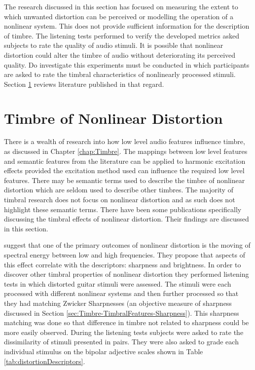 			The research discussed in this section has focused on measuring the extent to which unwanted
			distortion can be perceived or modelling the operation of a nonlinear system. This does not provide
			sufficient information for the description of timbre. The listening tests performed to verify the
			developed metrics asked subjects to rate the quality of audio stimuli. It is possible that nonlinear
			distortion could alter the timbre of audio without deteriorating its perceived quality. Do
			investigate this experiments must be conducted in which participants are asked to rate the timbral
			characteristics of nonlinearly processed stimuli. Section \ref{sec:Excitation-Timbre} reviews
			literature published in that regard.

\section{Timbre of Nonlinear Distortion}
\label{sec:Excitation-Timbre}
	There is a wealth of research into how low level audio features influence timbre, as discussed in Chapter
	\ref{chap:Timbre}. The mappings between low level features and semantic features from the literature can be applied
	to harmonic excitation effects provided the excitation method used can influence the required low level features.
	There may be semantic terms used to describe the timbre of nonlinear distortion which are seldom used to describe
	other timbres. The majority of timbral research does not focus on nonlinear distortion and as such does not
	highlight these semantic terms. There have been some publications specifically discussing the timbral effects of
	nonlinear distortion. Their findings are discussed in this section.

	\citet{marui2005predicting} suggest that one of the primary outcomes of nonlinear distortion is the moving of
	spectral energy between low and high frequencies. They propose that aspects of this effect correlate with the
	descriptors: sharpness and brightness. In order to discover other timbral properties of nonlinear distortion they
	performed listening tests in which distorted guitar stimuli were assessed. The stimuli were each processed with
	different nonlinear systems and then further processed so that they had matching Zwicker Sharpnesses (an objective
	measure of sharpness \citep{fastl2007psychoacoustics} discussed in Section
	\ref{sec:Timbre-TimbralFeatures-Sharpness}). This sharpness matching was done so that difference in timbre not
	related to sharpness could be more easily observed. During the listening tests subjects were asked to rate the
	dissimilarity of stimuli presented in pairs. They were also asked to grade each individual stimulus on the bipolar
	adjective scales shown in Table \ref{tab:distortionDescriptors}.

